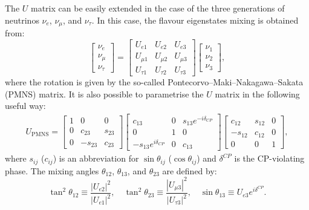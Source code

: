 The $U$ matrix can be easily extended in the case of the three generations of neutrinos $\nu_{e}$, $\nu_{\mu}$, and $\nu_{\tau}$. In this case, the flavour eigenstates mixing is obtained from:
\begin{equation}
\begin{bmatrix}
\nu_{e}\\
\nu_{\mu}\\
\nu_{\tau}
\end{bmatrix}=
\begin{bmatrix} U_{e 1} & U_{e 2} & U_{e 3} \\ U_{\mu 1} & U_{\mu 2} & U_{\mu 3} \\ U_{\tau 1} & U_{\tau 2} & U_{\tau 3} 
\end{bmatrix} 
\begin{bmatrix} \nu_1 \\ \nu_2 \\ \nu_3 \end{bmatrix},
\end{equation}
where the rotation is given by the so-called Pontecorvo–Maki–Nakagawa–Sakata (PMNS) matrix. It is also possible to parametrise the $U$ matrix in the following useful way:
\begin{align} 
  U_{\mathrm{PMNS}} = \begin{bmatrix} 1 & 0 & 0 \\ 0 & c_{23} & s_{23} \\ 0 & -s_{23} & c_{23} \end{bmatrix}
 \begin{bmatrix} c_{13} & 0 & s_{13}e^{-i\delta_{CP}} \\ 0 & 1 & 0 \\ -s_{13}e^{i\delta_{CP}} & 0 & c_{13} \end{bmatrix}
 \begin{bmatrix} c_{12} & s_{12} & 0 \\ -s_{12} & c_{12} & 0 \\ 0 & 0 & 1 \end{bmatrix},\label{eq:pmns}
\end{align}
where  $s_{ij}$ ($c_{ij}$) is an abbreviation for $\sin\theta_{ij}$ ($\cos\theta_{ij}$) and $\delta^{CP}$ is the CP-violating phase. The mixing angles $\theta_{12}$, $\theta_{13}$, and $\theta_{23}$ are defined by:
\begin{equation}
    \tan^2\theta_{12}\equiv\frac{|U_{e2}|^2}{|U_{e1}|^2},\quad
    \tan^2\theta_{23}\equiv\frac{|U_{\mu3}|^2}{|U_{\tau3}|^2},\quad
    \sin\theta_{13}\equiv U_{e3}e^{i\delta^{CP}}.
\end{equation}

